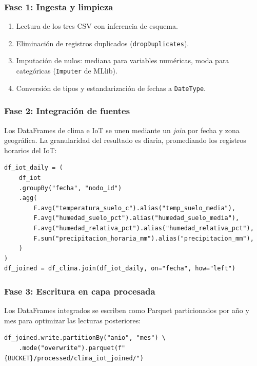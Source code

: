 \documentclass[12pt,a4paper]{article}
\begin{document}
\subsubsection{Fase 1: Ingesta y limpieza}
\begin{enumerate}[noitemsep]
  \item Lectura de los tres CSV con inferencia de esquema.
  \item Eliminación de registros duplicados (\texttt{dropDuplicates}).
  \item Imputación de nulos: mediana para variables numéricas, moda para
    categóricas (\texttt{Imputer} de MLlib).
  \item Conversión de tipos y estandarización de fechas a
    \texttt{DateType}.
\end{enumerate}

\subsubsection{Fase 2: Integración de fuentes}
Los DataFrames de clima e IoT se unen mediante un \textit{join} por fecha
y zona geográfica. La granularidad del resultado es diaria, promediando
los registros horarios del IoT:

\begin{lstlisting}[style=pythonstyle, caption={Join clima-IoT}]
df_iot_daily = (
    df_iot
    .groupBy("fecha", "nodo_id")
    .agg(
        F.avg("temperatura_suelo_c").alias("temp_suelo_media"),
        F.avg("humedad_suelo_pct").alias("humedad_suelo_media"),
        F.avg("humedad_relativa_pct").alias("humedad_relativa_pct"),
        F.sum("precipitacion_horaria_mm").alias("precipitacion_mm"),
    )
)
df_joined = df_clima.join(df_iot_daily, on="fecha", how="left")
\end{lstlisting}

\subsubsection{Fase 3: Escritura en capa procesada}
Los DataFrames integrados se escriben como Parquet particionados por año
y mes para optimizar las lecturas posteriores:

\begin{lstlisting}[style=pythonstyle, caption={Escritura Parquet particionado}]
df_joined.write.partitionBy("anio", "mes") \
    .mode("overwrite").parquet(f"{BUCKET}/processed/clima_iot_joined/")
\end{lstlisting}
\end{document}
